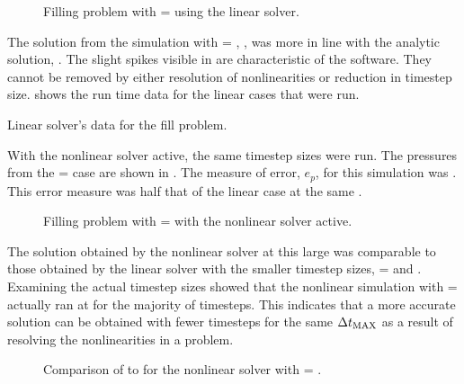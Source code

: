 \begin{figure}[h!tb]
\centering

\caption{Filling problem with \dtmax{} =  using the linear solver.}
\label{fig:vmpLinFill5em2}
\end{figure}

The solution from the simulation with \dtmax{} = , , was more in line with the analytic solution, .
The slight spikes visible in  are characteristic of the \cobra{} software.
They cannot be removed by either resolution of nonlinearities or reduction in timestep size.
 shows the run time data for the linear cases that were run.

\begin{table}[h!tb]
\centering
\singlespace

\caption{Linear solver's data for the fill problem.}
\label{tab:vmpLinRunTime}
\end{table}

With the nonlinear solver active, the same timestep sizes were run.
The pressures from the \dtmax{} =  case are shown in .
The measure of error, $e_{p}$, for this simulation was .
This error measure was half that of the linear case at the same \dtmax{}.

\begin{figure}[h!tb]
\centering

\caption{Filling problem with \dtmax{} =  with the nonlinear solver active.}
\label{fig:nlnFill1em1}
\end{figure}

The solution obtained by the nonlinear solver at this large \dtmax{} was comparable to those obtained by the linear solver with the smaller timestep sizes, \dtmax{} =  and .
Examining the actual timestep sizes showed that the nonlinear simulation with \dtmax{} =  actually ran at \dtmax{} for the majority of timesteps.
This indicates that a more accurate solution can be obtained with fewer timesteps for the same $\dtmax{}$ as a result of resolving the nonlinearities in a problem. 

\begin{figure}[h!tb]
\centering

\caption{Comparison of \dt{} to \dtcrnt{} for the nonlinear solver with \dtmax{} = .}
\label{fig:vmpDeltaTNln1em1}
\end{figure}

